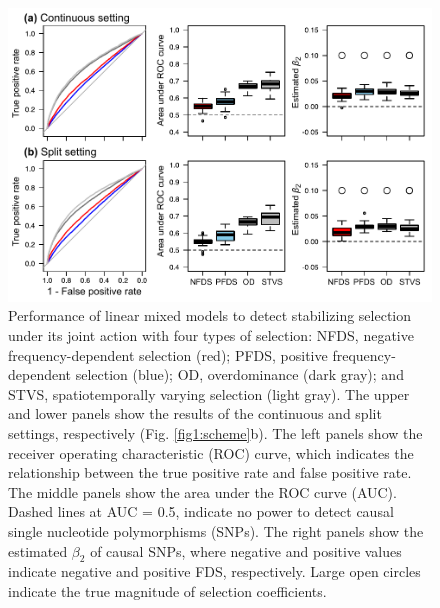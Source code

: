 \documentclass[12pt,]{article}
\begin{document}
\begin{figure}[]
  \includegraphics[width=\linewidth]{beta1LMMdomi.pdf}
  \caption{Performance of linear mixed models to detect stabilizing selection under its joint action with four types of selection: NFDS, negative frequency-dependent selection (red); PFDS, positive frequency-dependent selection (blue); OD, overdominance (dark gray); and STVS, spatiotemporally varying selection (light gray). The upper and lower panels show the results of the continuous and split settings, respectively (Fig. \ref{fig1:scheme}b). The left panels show the receiver operating characteristic (ROC) curve, which indicates the relationship between the true positive rate and false positive rate. The middle panels show the area under the ROC curve (AUC). Dashed lines at AUC = 0.5, indicate no power to detect causal single nucleotide polymorphisms (SNPs). The right panels show the estimated $\beta_2$ of causal SNPs, where negative and positive values indicate negative and positive FDS, respectively. Large open circles indicate the true magnitude of selection coefficients.}
  \label{figS6:beta1LMM}
\end{figure}
\end{document}
